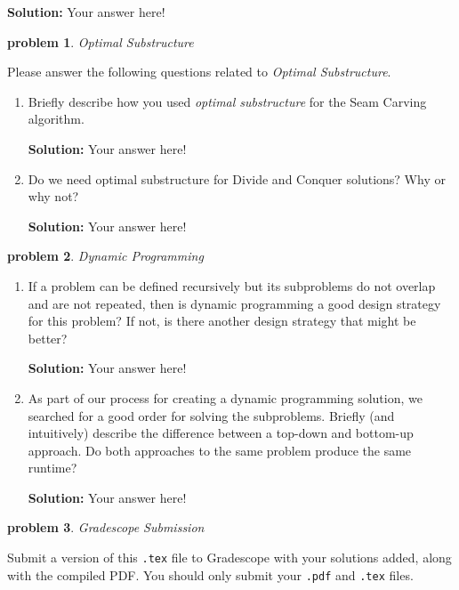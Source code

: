 \documentclass[10pt]{article}
\newcommand{\solution}[1]{\color{blue}\hfill\break\noindent\textbf{Solution:} #1\color{black}}
\newtheorem{problem}{\sc\color{cit}problem}
\begin{document}
    \solution{
    Your answer here!
    }
  
\begin{problem}Optimal Substructure\end{problem}
Please answer the following questions related to \emph{Optimal Substructure}.
\begin{enumerate}
    \item Briefly describe how you used \emph{optimal substructure} for the Seam Carving algorithm.
    
    \solution{
    Your answer here!
    }
    \item Do we need optimal substructure for Divide and Conquer solutions?  Why or why not?
    
    \solution{
    Your answer here!
    }
\end{enumerate}

\begin{problem}Dynamic Programming\end{problem}
\begin{enumerate}
\item If a problem can be defined recursively but its subproblems do not overlap and are not repeated, then is dynamic programming a good design strategy for this problem?  If not, is there another design strategy that might be better?

    \solution{
    Your answer here!
    }
\item As part of our process for creating a dynamic programming solution, we searched for a good order for solving the subproblems.  Briefly (and intuitively) describe the difference between a top-down and bottom-up approach.  Do both approaches to the same problem produce the same runtime?

    \solution{
    Your answer here!
    }
\end{enumerate}

\begin{problem} Gradescope Submission \end{problem}
Submit a version of this \verb|.tex| file to Gradescope with your solutions added, along with the compiled PDF.  You should only submit your \verb|.pdf| and \verb|.tex| files.
\end{document}
